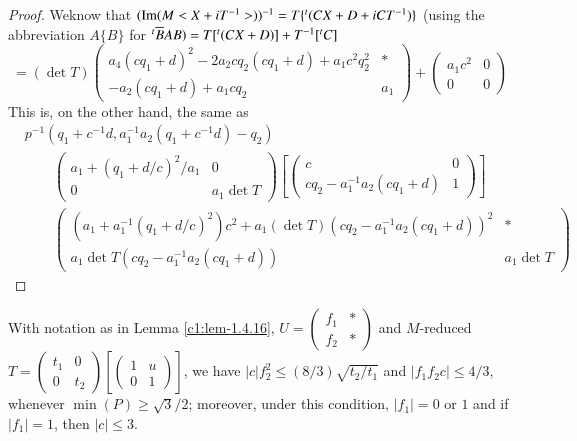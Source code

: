 \begin{proof}
We\pageoriginale know that $(\operatorname{Im}
(M<X+iT^{-1}>))^{-1}=T\{{}^{t}(CX+D+iCT^{-1})\}$ (using the
abbreviation $A\{B\}$ for ${}^{t}\overline{B}AB)
=T[{}^{t}(CX+D)]+T^{-1}[{}^{t}C]$
$$
=(\det T)
\begin{pmatrix}
a_{4}(cq_{1}+d)^{2}-2a_{2}cq_{2}(cq_{1}+d)+a_{1}c^{2}q^{2}_{2} &
\ast\\
-a_{2}(cq_{1}+d)+a_{1}cq_{2} & a_{1}
\end{pmatrix}
+
\begin{pmatrix}
a_{1}c^{2} & 0\\
0 & 0
\end{pmatrix}
$$
This is, on the other hand, the same as
{\fontsize{10}{12}\selectfont
\begin{align*}
& p^{-1}(q_{1}+c^{-1}d, a^{-1}_{1}a_{2}(q_{1}+c^{-1}d)-q_{2})\\
&\qquad 
\begin{pmatrix}
a_{1}+(q_{1}+d/c)^{2}/a_{1} & 0\\
0 & a_{1}\det T
\end{pmatrix}
\left[
\begin{pmatrix}
c & 0\\
cq_{2}-a^{-1}_{1}a_{2}(cq_{1}+d) & 1
\end{pmatrix}
\right]\\
&\qquad 
\begin{pmatrix}
(a_{1}+a^{-1}_{1}(q_{1}+d/c)^{2})c^{2}+a_{1}(\det
  T)(cq_{2}-a^{-1}_{1}a_{2}(cq_{1}+d))^{2} & \ast\\
a_{1}\det T(cq_{2}-a^{-1}_{1}a_{2}(cq_{1}+d)) & a_{1}\det T
\end{pmatrix}
\end{align*}}
\end{proof}

\begin{sublemma}\label{c1:lem-1.4.17}
With notation as in Lemma \ref{c1:lem-1.4.16},
$U=\left(\begin{smallmatrix} f_{1} & \ast\\ f_{2} & \ast
\end{smallmatrix}\right)$ and $M$-reduced $T=\left(\begin{smallmatrix}
t_{1} & 0\\ 0 &
t_{2} \end{smallmatrix}\right)\left[\left(\begin{smallmatrix} 
1 & u\\ 0 & 1  \end{smallmatrix}\right)\right]$, we have
$|c|f^{2}_{2}\leq (8/3)\sqrt{t_{2}/t_{1}}$ and $|f_{1}f_{2}c|\leq
4/3$, whenever $\min (P)\geq \sqrt{3}/2$; moreover, under this
condition, $|f_{1}|=0$ or $1$ and if $|f_{1}|=1$, then $|c|\leq 3$. 
\end{sublemma}

